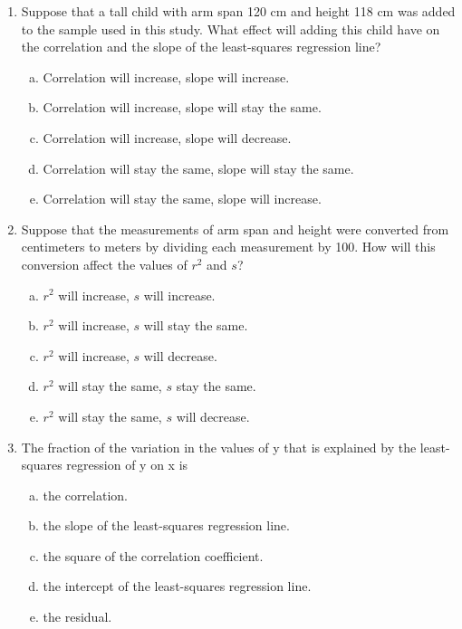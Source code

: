 \documentclass[a4paper,12pt,twoside]{book}
\begin{document}
\begin{enumerate}
  \item Suppose that a tall child with arm span 120 cm and height 118 cm was added to the sample used in this study. What effect will adding this child have on the correlation and the slope of the least-squares regression line?
      \begin{enumerate}[(a)]
          \item Correlation will increase, slope will increase.
          \item Correlation will increase, slope will stay the same.
          \item Correlation will increase, slope will decrease.
          \item Correlation will stay the same, slope will stay the same.
          \item Correlation will stay the same, slope will increase.
      \end{enumerate}
      \vspace{0.3cm}
    
   \item Suppose that the measurements of arm span and height were converted from centimeters to meters by dividing each measurement by 100. How will this conversion affect the values of $r^2$ and $s$?
   
       \begin{enumerate}[(a)]
           \item $r^2$  will increase, $s$ will increase.
           \item $r^2$  will increase, $s$ will stay the same.
           \item $r^2$  will increase, $s$ will decrease.
           \item $r^2$  will stay the same, $s$ stay the same.
           \item $r^2$  will stay the same, $s$ will decrease.
       \end{enumerate}
       \vspace{0.3cm}
       
   \item The fraction of the variation in the values of y that is explained by the least-squares regression of y on x is
       \begin{enumerate}[(a)]
           \item the correlation.
           \item the slope of the least-squares regression line.
           \item the square of the correlation coefficient.
           \item the intercept of the least-squares regression line.
           \item the residual.
       \end{enumerate}
       \vspace{0.3cm}
       

\end{enumerate}
\end{document}
